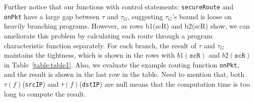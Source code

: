 Further notice that our functions with control statements: \texttt{secureRoute} and \texttt{onPkt} have a large gap between $\tau$ and $\tau_G$, suggesting $\tau_G$'s bound is loose on heavily branching programs. However, as rows b1(scR) and b2(scR) show, we can ameliorate this problem by calculating each route through a program characteristic function separately. For each branch, the result of $\tau$ and $\tau_G$ maintains the tightness, which is shown in the rows with $b1(\texttt{scR})$ and $b2(\texttt{scR})$ in Table~\ref{table:table1}. Also, we evaluate the example routing function \texttt{onPkt}, and the result is shown in the last row in the table. Need to mention that, both $\tau(f)$(\texttt{srcIP}) and $\tau(f)$(\texttt{dstIP}) are null means that the computation time is too long to compute the result.


